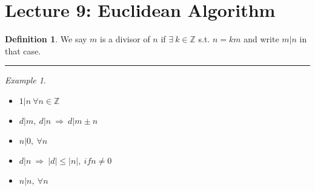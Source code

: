 \documentclass{article}
\theoremstyle{definition}
\newtheorem{definition}{Definition}[section]
\theoremstyle{remark}
\newtheorem*{example}{Example}
\begin{document}
\section{Lecture 9: Euclidean Algorithm}
\begin{definition}
We say $m$ is a divisor of $n$ if $\exists ~k\in\mathbb{Z}$ s.t. $n=km$ and write $m|n$ in that case.\\
\end{definition}
\hrule
\vspace{2mm}
\begin{example}~
\begin{itemize}
\item $1|n~\forall n\in \mathbb{Z}$
\item $d|m,~d|n ~\Rightarrow ~d|m\pm n$
\item $n|0,~\forall n$
\item $d|n ~\Rightarrow ~|d|\leq |n|,~if n\neq 0$
\item $n|n,~\forall n$
\end{itemize}
\end{example}
\end{document}
